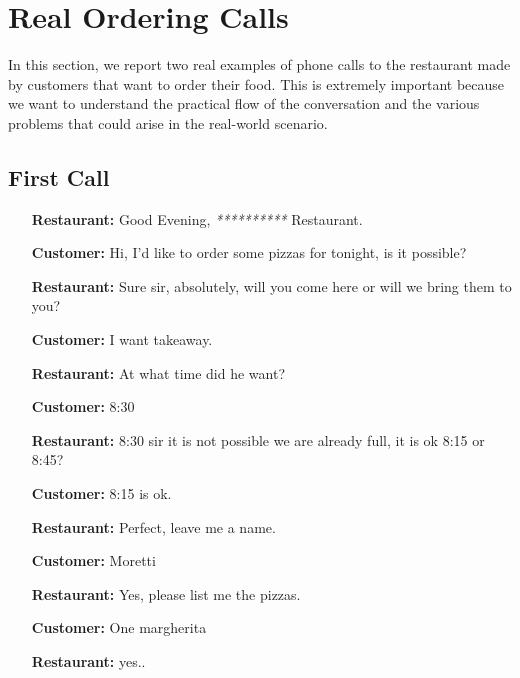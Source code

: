 \section{Real Ordering Calls}

In this section, we report two real examples of phone calls to the restaurant made by
customers that want to order their food. This is extremely important because we want
to understand the practical flow of the conversation and the various problems that
could arise in the real-world scenario.

\subsection*{First Call}

\begin{itemize}

\item[\textbf{Restaurant:}] Good Evening, \textit{**********} Restaurant.

\item[\textbf{Customer:}] Hi, I'd like to order some pizzas for tonight, is it possible? 

\item[\textbf{Restaurant:}] Sure sir, absolutely, will you come here or will we bring them to you? 

\item[\textbf{Customer:}] I want takeaway.

\item[\textbf{Restaurant:}] At what time did he want? 

\item[\textbf{Customer:}]  8:30

\item[\textbf{Restaurant:}] 8:30 sir it is not possible we are already full, it is ok 8:15 or 8:45? 

\item[\textbf{Customer:}] 8:15 is ok. 

\item[\textbf{Restaurant:}] Perfect, leave me a name. 

\item[\textbf{Customer:}] Moretti

\item[\textbf{Restaurant:}] Yes, please list me the pizzas.

\item[\textbf{Customer:}]  One margherita

\item[\textbf{Restaurant:}] yes..


\end{itemize}
